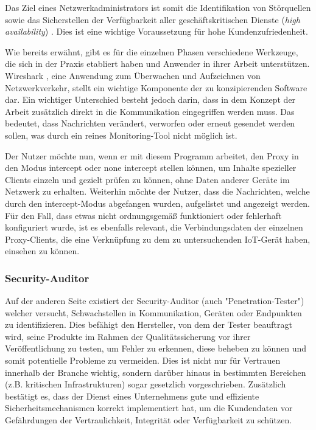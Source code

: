     Das Ziel eines Netzwerkadministrators ist somit die Identifikation von Störquellen sowie das Sicherstellen der Verfügbarkeit aller geschäftskritischen Dienste (\emph{high availability}) \cite{burgess2004principles}. Dies ist eine wichtige Voraussetzung für hohe Kundenzufriedenheit.
    
    Wie bereits erwähnt, gibt es für die einzelnen Phasen verschiedene Werkzeuge, die sich in der Praxis etabliert haben und Anwender in ihrer Arbeit unterstützen.
    Wireshark \cite{SandersChris2017Ppa}, eine Anwendung zum Überwachen und Aufzeichnen von Netzwerkverkehr, stellt ein wichtige Komponente der zu konzipierenden Software dar. Ein wichtiger Unterschied besteht jedoch darin, dass in dem Konzept der Arbeit zusätzlich direkt in die Kommunikation eingegriffen werden muss. Das bedeutet, dass Nachrichten verändert, verworfen oder erneut gesendet werden sollen, was durch ein reines Monitoring-Tool nicht möglich ist.
    
    Der Nutzer möchte nun, wenn er mit diesem Programm arbeitet, den Proxy in den Modus \glqq intercept\grqq{} oder \glqq none intercept\grqq{} stellen können, um Inhalte spezieller Clients einzeln und gezielt prüfen zu können, ohne Daten anderer Geräte im Netzwerk zu erhalten.
    Weiterhin möchte der Nutzer, dass die Nachrichten, welche durch den \glqq intercept\grqq{}-Modus abgefangen wurden, aufgelistet und angezeigt werden.
    Für den Fall, dass etwas nicht ordnungsgemäß funktioniert oder fehlerhaft konfiguriert wurde, ist es ebenfalls relevant, die Verbindungsdaten der einzelnen Proxy-Clients, die eine Verknüpfung zu dem zu untersuchenden \acs{IoT}-Gerät haben, einsehen zu können.
    
\subsubsection{Security-Auditor}
    Auf der anderen Seite existiert der Security-Auditor (auch "Penetration-Tester") welcher versucht, Schwachstellen in Kommunikation, Geräten oder Endpunkten zu identifizieren.
    Dies befähigt den Hersteller, von dem der Tester beauftragt wird, seine Produkte im Rahmen der Qualitätssicherung vor ihrer Veröffentlichung zu testen, um Fehler zu erkennen, diese beheben zu können und somit potentielle Probleme zu vermeiden. Dies ist nicht nur für Vertrauen innerhalb der Branche wichtig, sondern darüber hinaus in bestimmten Bereichen (z.B. kritischen Infrastrukturen) sogar gesetzlich vorgeschrieben.
    Zusätzlich bestätigt es, dass der Dienst eines Unternehmens gute und effiziente Sicherheitsmechanismen korrekt implementiert hat, um die Kundendaten vor Gefährdungen der Vertraulichkeit, Integrität oder Verfügbarkeit zu schützen.
    
